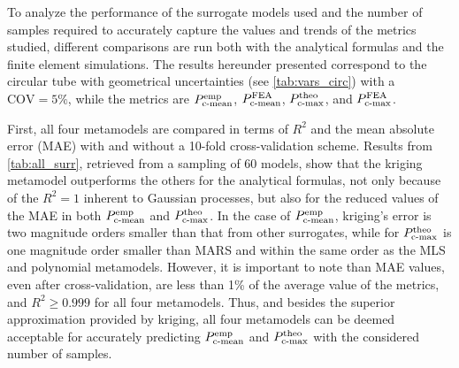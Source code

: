 \documentclass[12pt,number,preprint,review,times]{elsarticle}
\begin{document}




To analyze the performance of the surrogate models used and the number of samples required to accurately capture the values and trends of the metrics studied, different comparisons are run both with the analytical formulas and the finite element simulations. The results hereunder presented correspond to the circular tube with geometrical uncertainties (see \cref{tab:vars_circ}) with a $\mathrm{COV} = 5\%$, while the metrics are $P^{\mathrm{emp}}_{\mathrm{c{\text -}mean}}$, $P^{\mathrm{FEA}}_{\mathrm{c{\text -}mean}}$, $P^{\mathrm{theo}}_{\mathrm{c{\text -}max}}$, and $P^{\mathrm{FEA}}_{\mathrm{c{\text -}max}}$.  

First, all four metamodels are compared in terms of $R^2$ and the mean absolute error (MAE) with and without a 10-fold cross-validation scheme. Results from \cref{tab:all_surr}, retrieved from a sampling of 60 models, show that the kriging metamodel outperforms the others for the analytical formulas, not only because of the $R^2 = 1$ inherent to Gaussian processes, but also for the reduced values of the MAE in both $P^{\mathrm{emp}}_{\mathrm{c{\text -}mean}}$ and $P^{\mathrm{theo}}_{\mathrm{c{\text -}max}}$. In the case of $P^{\mathrm{emp}}_{\mathrm{c{\text -}mean}}$, kriging's error is two magnitude orders smaller than that from other surrogates, while for $P^{\mathrm{theo}}_{\mathrm{c{\text -}max}}$ is one magnitude order smaller than MARS and within the same order as the MLS and polynomial metamodels. However, it is important to note than MAE values, even after cross-validation, are less than 1\% of the average value of the metrics, and $R^2 \geq 0.999$ for all four metamodels. Thus, and besides the superior approximation provided by kriging, all four metamodels can be deemed acceptable for accurately predicting $P^{\mathrm{emp}}_{\mathrm{c{\text -}mean}}$ and $P^{\mathrm{theo}}_{\mathrm{c{\text -}max}}$ with the considered number of samples.
\end{document}
